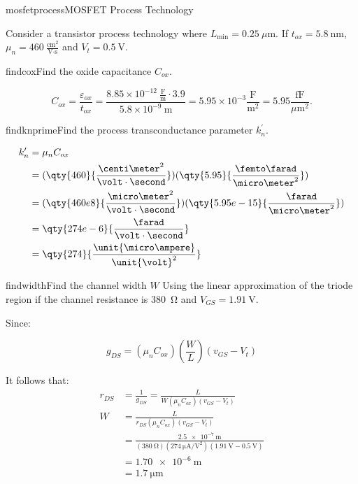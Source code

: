 \begin{mainquestion}{mosfetprocess}{MOSFET Process Technology}

Consider a transistor process technology where $L_{\text{min}} = 0.25\ \mu\text{m}$. If $t_{ox} = 5.8\ \text{nm}$, $\mu_{n} = 460\ \frac{\text{cm}^{2}}{\text{V}\cdot\text{s}}$ and $V_{t} = \qty{0.5}{\volt}$.

\begin{partquestion}{findcox}{Find the oxide capacitance $C_{ox}$.}
\begin{answer}
\[
C_{ox} = \frac{\varepsilon_{ox}}{t_{ox}} = \frac{8.85 \times 10^{-12} \ \frac{\text{F}}{\text{m}} \cdot 3.9}{5.8 \times 10^{-9}\ \text{m}} = 5.95 \times 10^{-3} \frac{\text{F}}{\text{m}^{2}} = 5.95 \frac{\text{fF}}{\mu\text{m}^{2}}.
\]
\end{answer}
\end{partquestion}

\begin{partquestion}{findknprime}{Find the process transconductance parameter $k_{n}^{\prime}$.}
\begin{answer}
\begin{align*}
    k_{n}^{\prime} &= \mu_{n}C_{ox}\\
    &= (\qty{460}{\frac{\centi\meter^2}{\volt\cdot\second}})(\qty{5.95}{\frac{\femto\farad}{\micro\meter^2}}) \\
    &= (\qty{460e8}{\frac{\micro\meter^2}{\volt\cdot\second}})(\qty{5.95e-15}{\frac{\farad}{\micro\meter^2}}) \\
    &= \qty{274e-6}{\frac{\farad}{\volt\cdot\second}} \\
    &= \qty{274}{\frac{\unit{\micro\ampere}}{\unit{\volt}^2}}
\end{align*}
\end{answer}
\end{partquestion}

\begin{partquestion}{findwidth}{Find the channel width $W$ Using the linear approximation of the triode region if the channel resistance is \qty{380}{\ohm} and $V_{GS} = \qty{1.91}{\volt}$.}
\begin{answer}
Since:

\[
g_{DS} = (\mu_{n} C_{ox})\left(\frac{W}{L}\right)(v_{GS} - V_{t})
\]

It follows that:
\begin{align*}
    r_{DS} &= \frac{1}{g_{DS}} = \frac{L}{W(\mu_n C_{ox})(v_{GS} - V_t)} \\
    W &= \frac{L}{r_{DS} (\mu_n C_{ox})(v_{GS} - V_t)} \\
    &= \frac{\qty{2.5e-7}{\meter}}{(\qty{380}{\ohm}) (\qty{274}{\unit{\micro\ampere}/\unit{\volt}^2})(\qty{1.91}{\volt} - \qty{0.5}{\volt})} \\
    &= \qty{1.70e-6}{\meter} \\
    &= \qty{1.7}{\micro\meter}
\end{align*}
\end{answer}
\end{partquestion}


\end{mainquestion}
